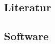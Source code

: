   \subsection{Literatur}
  \label{ssec:literatur}
    \nocite{*}
    \printbibliography


  \subsection{Software}
  \label{ssec:software}
